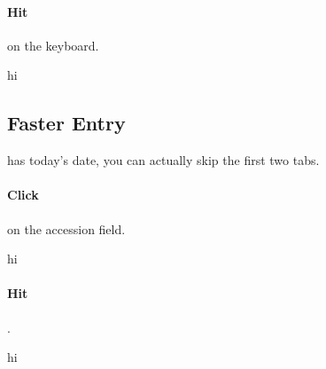 \noindent
\begin{minipage}{.5\textwidth}
    \paragraph{Hit} {\faKeyboardO}  on the keyboard.
\end{minipage}%
\begin{minipage}{.1\textwidth}
{ \color{white} hi}
\end{minipage}%
\begin{minipage}{.5\textwidth}
\end{minipage}


\subsection{Faster Entry}
 has today's date, you can actually skip the first two tabs.\\

\noindent
\begin{minipage}{.5\textwidth}
\paragraph{Click} on the accession field.
\end{minipage}%
\begin{minipage}{.1\textwidth}
{ \color{white} hi}
\end{minipage}%
\begin{minipage}{.5\textwidth}
\end{minipage}

\noindent
\begin{minipage}{.5\textwidth}
\paragraph{Hit} {\faKeyboardO} .
\end{minipage}%
\begin{minipage}{.1\textwidth}
{ \color{white} hi}
\end{minipage}%
\begin{minipage}{.5\textwidth}
\end{minipage}

